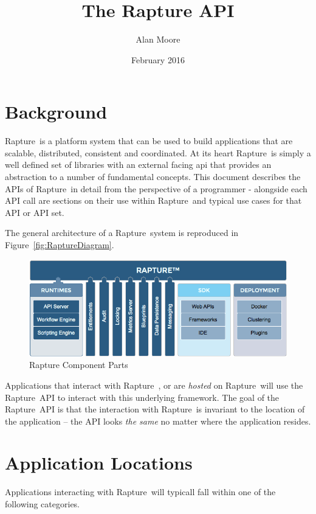 \documentclass[12pt,twoside,a4paper]{article}
\newcommand{\Rapture}{Rapture~}
\begin{document}
\title{The Rapture API}
\author{Alan Moore}
\date{February 2016}

\maketitle
\tableofcontents

\section{Background}
\Rapture is a platform system that can be used to build applications that are scalable,
distributed, consistent and coordinated. At its heart \Rapture is simply a well defined
set of libraries with an external facing api that provides an abstraction to a number
of fundamental concepts. This document describes the APIs of \Rapture in detail from the
perspective of a programmer - alongside each API call are sections on their use within
\Rapture and typical use cases for that API or API set.

The general architecture of a \Rapture system is reproduced in Figure~\vref{fig:RaptureDiagram}.

\begin{figure}[htb]
\centering
\includegraphics[width=15cm]{Graphics/rapturecore}
\caption{Rapture Component Parts}
\label{fig:RaptureDiagram}
\end{figure}

Applications that interact with \Rapture, or are \emph{hosted} on \Rapture will
use the \Rapture API to interact with this underlying framework. The goal of
the \Rapture API is that the interaction with \Rapture is invariant to the location
of the application -- the API looks \emph{the same} no matter where the application
resides.

\section{Application Locations}
Applications interacting with \Rapture will typicall fall within one of the
following categories.
\end{document}
